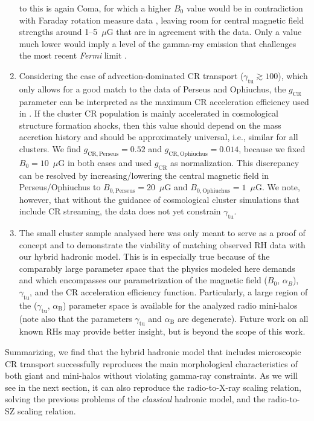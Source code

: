 \documentclass[traditabstract]{aa}
\newcommand{\rmn}{\mathrm}
\begin{document}
\begin{enumerate}
  to this is again Coma, for which a higher $B_{0}$ value would be in contradiction
  with Faraday rotation measure data \citep{2010A&A...513A..30B}, leaving room
  for central magnetic field strengths around 1--5~$\mu$G that are in agreement
  with the data. Only a value much lower would imply a level of the gamma-ray
  emission that challenges the most recent {\em Fermi} limit
  \citep{2012AAS...21920701Z}.
\item Considering the case of advection-dominated CR transport
  ($\gamma_{\rmn{tu}}\gtrsim100$), which only allows for a good match to the
  data of Perseus and Ophiuchus, the $g_{\rmn{CR}}$ parameter can be
  interpreted as the maximum CR acceleration efficiency used in
  \cite{2010MNRAS.409..449P}. If the cluster CR population is mainly accelerated
  in cosmological structure formation shocks, then this value should depend on
  the mass accretion history and should be approximately universal, i.e., similar for
  all clusters. We find $g_{\rmn{CR, Perseus}} = 0.52$ and $g_{\rmn{CR,
      Ophiuchus}} = 0.014$, because we fixed $B_{0}=10$~$\mu$G in both cases and
  used $g_{\rmn{CR}}$ as normalization. This discrepancy can be resolved by
  increasing/lowering the central magnetic field in Perseus/Ophiuchus to
  $B_{0,\rmn{Perseus}}=20$~$\mu$G and $B_{0,\rmn{Ophiuchus}}=1$~$\mu$G. We note,
  however, that without the guidance of cosmological cluster simulations that
  include CR streaming, the data does not yet constrain $\gamma_{\rmn{tu}}$.
\item The small cluster sample analysed here was only meant to serve as a proof
  of concept and to demonstrate the viability of matching observed RH data with
  our hybrid hadronic model. This is in especially true because of the
  comparably large parameter space that the physics modeled here demands and
  which encompasses our parametrization of the magnetic field ($B_0$,
  $\alpha_B$), $\gamma_{\rmn{tu}}$, and the CR acceleration efficiency
  function. Particularly, a large region of the ($\gamma_{\rmn{tu}}$,
  $\alpha_{\rmn{B}}$) parameter space is available for the analyzed radio
  mini-halos (note also that the parameters $\gamma_{\rmn{tu}}$ and
  $\alpha_{\rmn{B}}$ are degenerate). Future work on all known RHs may provide
  better insight, but is beyond the scope of this work.
\end{enumerate}
Summarizing, we find that the hybrid hadronic model that includes microscopic CR
transport successfully reproduces the main morphological characteristics of both
giant and mini-halos without violating gamma-ray constraints. As we will see in
the next section, it can also reproduce the radio-to-X-ray scaling relation,
solving the previous problems of the \emph{classical} hadronic model, and the
radio-to-SZ scaling relation.
\end{document}
